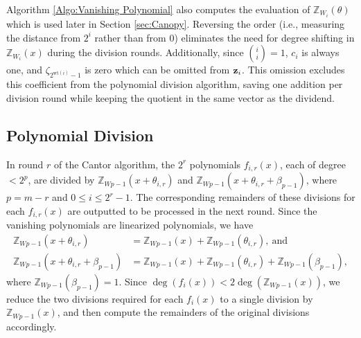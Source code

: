 Algorithm \ref{Algo:Vanishing Polynomial} also computes the evaluation of $\mathbb{Z}_{W_{i}}(\theta)$ which is used later in Section \ref{sec:Canopy}. Reversing the order (i.e., measuring the distance from $2^i$ rather than from $0$) eliminates the need for degree shifting in $\mathbb{Z}_{W_{i}}(x)$ during the division rounds. Additionally, since ${i \choose i} = 1$, $c_i$ is always one, and $\zeta_{2^{\text{wt}(i)}-1}$ is zero which can be omitted from ${\bf{z}}_i$. This omission excludes this coefficient from the polynomial division algorithm, saving one addition per division round while keeping the quotient in the same vector as the dividend. 


\subsection{Polynomial Division}
In round $r$ of the Cantor algorithm, the $2^r$ polynomials $f_{i,r}(x)$, each of degree $< 2^{p}$, are divided by $\mathbb{Z}_{W{p-1}}(x + \theta_{i,r})$ and $\mathbb{Z}_{W{p-1}}(x + \theta_{i,r} + \beta_{p-1})$, where $p = m - r$ and $0 \leq i \leq 2^r - 1$. The corresponding remainders of these divisions for each $f_{i,r}(x)$ are outputted to be processed in the next round. Since the vanishing polynomials are linearized polynomials, we have
\begin{align*}
	\mathbb{Z}_{W{p-1}}(x + \theta_{i,r}) &= \mathbb{Z}_{W{p-1}}(x) + \mathbb{Z}_{W{p-1}}(\theta_{i,r}),\ \text{and}\\
	\mathbb{Z}_{W{p-1}}(x + \theta_{i,r} + \beta_{p-1}) &= \mathbb{Z}_{W{p-1}}(x) + \mathbb{Z}_{W{p-1}}(\theta_{i,r}) + \mathbb{Z}_{W{p-1}}(\beta_{p-1}),
\end{align*}
where $\mathbb{Z}_{W{p-1}}(\beta_{p-1}) = 1$. Since $\deg(f_i(x)) < 2\deg(\mathbb{Z}_{W{p-1}}(x))$, we reduce the two divisions required for each $f_i(x)$ to a single division by $\mathbb{Z}_{W{p-1}}(x)$, and then compute the remainders of the original divisions accordingly.

